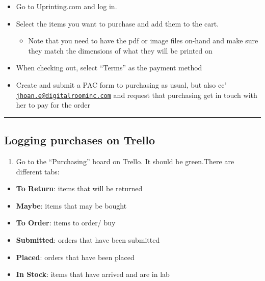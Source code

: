\documentclass[]{book}
\providecommand{\tightlist}{%
  \setlength{\itemsep}{0pt}\setlength{\parskip}{0pt}}
\begin{document}
\begin{itemize}
\tightlist
\item
  Go to Uprinting.com and log in.
\item
  Select the items you want to purchase and add them to the cart.

  \begin{itemize}
  \tightlist
  \item
    Note that you need to have the pdf or image files on-hand and make
    sure they match the dimensions of what they will be printed on
  \end{itemize}
\item
  When checking out, select ``Terms'' as the payment method
\item
  Create and submit a PAC form to purchasing as usual, but also cc'
  \href{mailto:jhoan.e@digitalroominc.com}{\nolinkurl{jhoan.e@digitalroominc.com}}
  and request that purchasing get in touch with her to pay for the order
\end{itemize}

\begin{center}\rule{0.5\linewidth}{0.5pt}\end{center}

\subsection{Logging purchases on
Trello}\label{logging-purchases-on-trello}

\begin{enumerate}
\def\labelenumi{\arabic{enumi}.}
\tightlist
\item
  Go to the ``Purchasing'' board on Trello. It should be green.There are
  different tabs:
\end{enumerate}

\begin{itemize}
\tightlist
\item
  \textbf{To Return}: items that will be returned
\item
  \textbf{Maybe}: items that may be bought
\item
  \textbf{To Order}: items to order/ buy
\item
  \textbf{Submitted}: orders that have been submitted
\item
  \textbf{Placed}: orders that have been placed
\item
  \textbf{In Stock}: items that have arrived and are in lab
\end{itemize}
\end{document}
